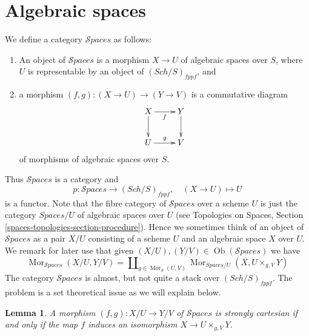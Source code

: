 \documentclass{stacks-project}
\theoremstyle{plain}
\newtheorem{lemma}[subsection]{Lemma}
\theoremstyle{definition}
\theoremstyle{remark}
\numberwithin{equation}{subsection}
\def\Sch{\mathit{Sch}}
\def\Mor{\mathop{\mathrm{Mor}}\nolimits}
\def\Ob{\mathop{\mathrm{Ob}}\nolimits}
\def\Spacesstack{\mathcal{S}\!\mathit{paces}}
\begin{document}
\section{Algebraic spaces}
\label{section-stack-of-spaces}

\noindent
We define a category $\Spacesstack$ as follows:
\begin{enumerate}
\item An object of $\Spacesstack$ is a morphism $X \to U$
of algebraic spaces over $S$, where $U$ is representable by an object of
$(\Sch/S)_{fppf}$, and
\item a morphism $(f, g) : (X \to U) \to (Y \to V)$
is a commutative diagram
$$
\xymatrix{
X \ar[d] \ar[r]_f & Y \ar[d] \\
U \ar[r]^g & V
}
$$
of morphisms of algebraic spaces over $S$.
\end{enumerate}
Thus $\Spacesstack$ is a category and
$$
p : \Spacesstack \to (\Sch/S)_{fppf},
\quad
(X \to U) \mapsto U
$$
is a functor. Note that the fibre category of $\Spacesstack$ over
a scheme $U$ is just the category $\textit{Spaces}/U$ of
algebraic spaces over $U$ (see
Topologies on Spaces, Section \ref{spaces-topologies-section-procedure}).
Hence we sometimes think of an object of $\Spacesstack$ as a
pair $X/U$ consisting of a scheme $U$ and an algebraic space $X$ over $U$.
We remark for later use that given
$(X/U), (Y/V) \in \Ob(\Spacesstack)$
we have
\begin{equation}
\label{equation-morphisms-spaces}
\Mor_{\Spacesstack}(X/U, Y/V)
=
\coprod\nolimits_{g \in \Mor_S(U, V)}
\Mor_{\textit{Spaces}/U}(X, U \times_{g, V} Y)
\end{equation}
The category $\Spacesstack$ is almost, but not quite a stack
over $(\Sch/S)_{fppf}$. The problem is a set theoretical
issue as we will explain below.

\begin{lemma}
\label{lemma-spaces-strongly-cartesian}
A morphism $(f, g) : X/U \to Y/V$
of $\Spacesstack$ is strongly cartesian if and only if the
map $f$ induces an isomorphism $X \to U \times_{g, V} Y$.
\end{lemma}
\end{document}
